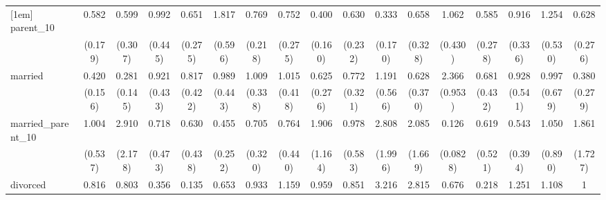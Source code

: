 {\begin{tabular}{l*{16}{c}}
[1em]
parent\_10           &       0.582         &       0.599         &       0.992         &       0.651         &       1.817         &       0.769         &       0.752         &       0.400\sym{*}  &       0.630         &       0.333\sym{*}  &       0.658         &       1.062         &       0.585         &       0.916         &       1.254         &       0.628         \\
                    &     (0.179)         &     (0.307)         &     (0.445)         &     (0.275)         &     (0.596)         &     (0.218)         &     (0.275)         &     (0.160)         &     (0.232)         &     (0.170)         &     (0.328)         &     (0.430)         &     (0.278)         &     (0.336)         &     (0.530)         &     (0.276)         \\
[1em]
married             &       0.420\sym{*}  &       0.281\sym{*}  &       0.921         &       0.817         &       0.989         &       1.009         &       1.015         &       0.625         &       0.772         &       1.191         &       0.628         &       2.366\sym{*}  &       0.681         &       0.928         &       0.997         &       0.380         \\
                    &     (0.156)         &     (0.145)         &     (0.433)         &     (0.422)         &     (0.443)         &     (0.338)         &     (0.418)         &     (0.276)         &     (0.321)         &     (0.566)         &     (0.370)         &     (0.953)         &     (0.432)         &     (0.541)         &     (0.679)         &     (0.279)         \\
[1em]
married\_parent\_10   &       1.004         &       2.910         &       0.718         &       0.630         &       0.455         &       0.705         &       0.764         &       1.906         &       0.978         &       2.808         &       2.085         &       0.126\sym{**} &       0.619         &       0.543         &       1.050         &       1.861         \\
                    &     (0.537)         &     (2.178)         &     (0.473)         &     (0.438)         &     (0.252)         &     (0.320)         &     (0.440)         &     (1.164)         &     (0.583)         &     (1.996)         &     (1.669)         &    (0.0828)         &     (0.521)         &     (0.394)         &     (0.890)         &     (1.727)         \\
[1em]
divorced            &       0.816         &       0.803         &       0.356         &       0.135         &       0.653         &       0.933         &       1.159         &       0.959         &       0.851         &       3.216         &       2.815         &       0.676         &       0.218         &       1.251         &       1.108         &           1         \\

\end{tabular}}
